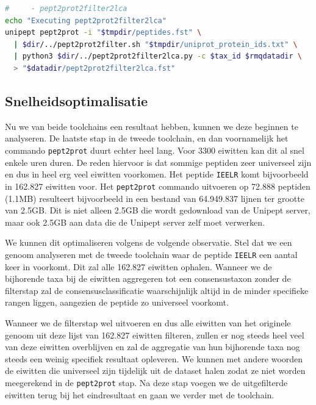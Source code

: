 \begin{lstlisting}[language=Bash,firstnumber=72]
#     - pept2prot2filter2lca
echo "Executing pept2prot2filter2lca"
unipept pept2prot -i "$tmpdir/peptides.fst" \
  | $dir/../pept2prot2filter.sh "$tmpdir/uniprot_protein_ids.txt" \
  | python3 $dir/../pept2prot2filter2lca.py -c $tax_id $rmqdatadir \
  > "$datadir/pept2prot2filter2lca.fst"
\end{lstlisting}


\subsection{Snelheidsoptimalisatie}
\label{sec:snelheidsoptimalisatie}

Nu we van beide toolchains een resultaat hebben, kunnen we deze beginnen te
analyseren. De laatste stap in de tweede toolchain, en dan voornamelijk het
commando \texttt{pept2prot} duurt echter heel lang. Voor 3300 eiwitten kan dit
al snel enkele uren duren. De reden hiervoor is dat sommige peptiden zeer
universeel zijn en dus in heel erg veel eiwitten voorkomen. Het peptide
\texttt{IEELR} komt bijvoorbeeld in 162.827 eiwitten voor. Het 
\texttt{pept2prot}
commando uitvoeren op 72.888 peptiden (1.1MB) resulteert bijvoorbeeld in een
bestand van 64.949.837 lijnen ter grootte van 2.5GB. Dit is niet alleen 2.5GB
die wordt gedownload van de Unipept server, maar ook 2.5GB aan data die de
Unipept server zelf moet verwerken.

We kunnen dit optimaliseren volgens de volgende observatie. Stel dat we een
genoom analyseren met de tweede toolchain waar de peptide \texttt{IEELR} een
aantal keer in voorkomt. Dit zal alle 162.827 eiwitten ophalen. Wanneer we de 
bijhorende taxa bij de eiwitten aggregeren tot een consensustaxon zonder de 
filterstap zal de consensusclassificatie waarschijnlijk altijd in de minder 
specifieke rangen liggen, aangezien de peptide zo universeel voorkomt.

Wanneer we de filterstap wel uitvoeren en dus alle eiwitten van het originele
genoom uit deze lijst van 162.827 eiwitten filteren, zullen er nog steeds heel
veel van deze eiwitten overblijven en zal de aggregatie van hun bijhorende taxa
nog steeds een weinig specifiek resultaat opleveren. We kunnen met andere
woorden de eiwitten die universeel zijn tijdelijk uit de dataset halen zodat ze
niet worden meegerekend in de \texttt{pept2prot} stap. Na deze stap voegen we de
uitgefilterde eiwitten terug bij het eindresultaat en gaan we verder met de
toolchain.

